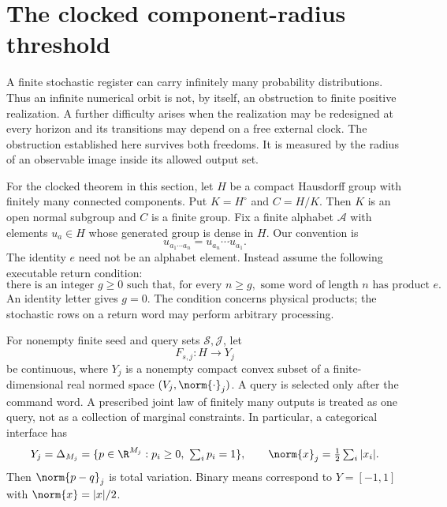 \section{The clocked component-radius threshold}\label{sec:intro54}
A finite stochastic register can carry infinitely many probability distributions. Thus an infinite numerical orbit is not, by itself, an obstruction to finite positive realization. A further difficulty arises when the realization may be redesigned at every horizon and its transitions may depend on a free external clock. The obstruction established here survives both freedoms. It is measured by the radius of an observable image inside its allowed output set.

For the clocked theorem in this section, let $H$ be a compact Hausdorff group with finitely many connected components. Put $K=H^\circ$ and $C=H/K$. Then $K$ is an open normal subgroup and $C$ is a finite group. Fix a finite alphabet $\mathcal A$ with elements $u_a\in H$ whose generated group is dense in $H$. Our convention is
\[
 u_{a_1\cdots a_n}=u_{a_n}\cdots u_{a_1}.
\]
The identity $e$ need not be an alphabet element. Instead assume the following executable return condition:
\begin{equation}\label{eq:returns54}
 \text{there is an integer }g\ge0\text{ such that, for every }n\ge g,
 \text{ some word of length }n\text{ has product }e.
\end{equation}
An identity letter gives $g=0$. The condition concerns physical products; the stochastic rows on a return word may perform arbitrary processing.

For nonempty finite seed and query sets $\mathcal S,\mathcal J$, let
\[
 F_{s,j}:H\longrightarrow Y_j
\]
be continuous, where $Y_j$ is a nonempty compact convex subset of a finite-dimensional real normed space $(V_j,\norm{\cdot}_j)$. A query is selected only after the command word. A prescribed joint law of finitely many outputs is treated as one query, not as a collection of marginal constraints. In particular, a categorical interface has
\[
 Y_j=\Delta_{M_j}=\{p\in\R^{M_j}:p_i\ge0,\ \textstyle\sum_i p_i=1\},
 \qquad \norm{x}_j=\tfrac12\sum_i|x_i|.
\]
Then $\norm{p-q}_j$ is total variation. Binary means correspond to $Y=[-1,1]$ with $\norm{x}=|x|/2$.

